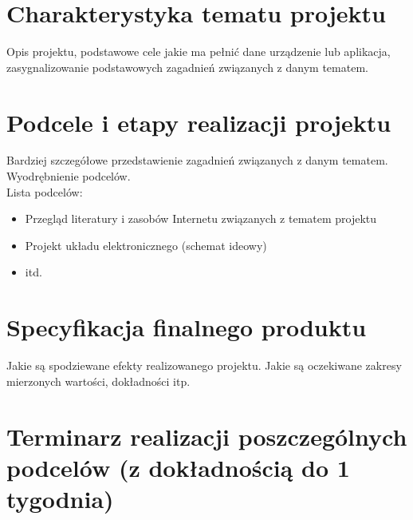 \documentclass[12pt,a4paper,polish]{article}
\begin{document}
%
%
\pdfpageheight   297mm
\pdfpagewidth    210mm

\wdsStronaTytulowa
\wdsSpisTresci


 \section{Charakterystyka tematu projektu}
 \label{sekcja-charakterystyka}

  Opis projektu, podstawowe cele jakie ma pełnić dane
  urządzenie lub aplikacja, zasygnalizowanie podstawowych
  zagadnień związanych z danym tematem.

 \section{Podcele i etapy realizacji projektu}

  Bardziej szczegółowe przedstawienie zagadnień związanych
  z danym tematem. Wyodrębnienie podcelów.\\
  Lista podcelów:
  \begin{itemize}
    \item Przegląd literatury i zasobów Internetu związanych
          z tematem projektu
    \item Projekt układu elektronicznego (schemat ideowy)
    \item itd.
  \end{itemize}

 \section{Specyfikacja finalnego produktu}

  Jakie są spodziewane efekty realizowanego projektu.
  Jakie są oczekiwane zakresy mierzonych wartości, dokładności itp.

  
  \section{Terminarz realizacji poszczególnych podcelów 
                {\small (z dokładnością do 1 tygodnia)}}
\end{document}
